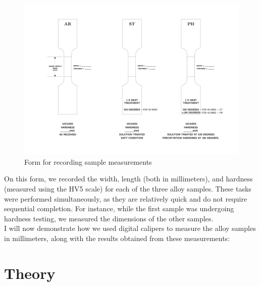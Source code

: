 \documentclass{article}
\begin{document}
\begin{figure}[H] 
    \centering 
    \includegraphics[width=\textwidth]{figures/alloys_base.jpg} 
    \caption{Form for recording sample measurements} 
    \label{fig:alloys} 
\end{figure}

On this form, we recorded the width, length (both in millimeters), and hardness (measured using the HV5 scale) for each of the three alloy samples. These tasks were performed simultaneously, as they are relatively quick and do not require sequential completion. For instance, while the first sample was undergoing hardness testing, we measured the dimensions of the other samples.\\[8pt]
I will now demonstrate how we used digital calipers to measure the alloy samples in millimeters, along with the results obtained from these measurements:

\newpage\vspace*{-5pt}
    \section{Theory}

    \newpage\vspace*{-20pt}
    
\end{document}
